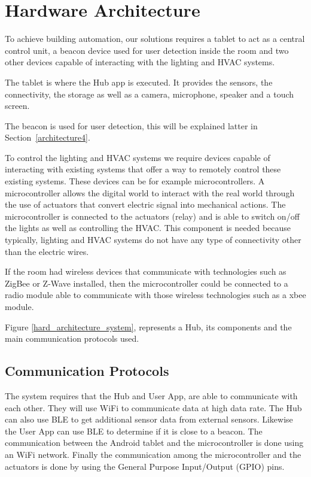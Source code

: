 \section{Hardware Architecture}\label{architecture3} 

To achieve building automation, our solutions requires a tablet to act as a central control unit, a beacon device used for user detection inside the room and two other devices capable of interacting with the lighting and \ac{HVAC} systems.

The tablet is where the Hub app is executed. It provides the sensors, the connectivity, the storage as well as a camera, microphone, speaker and a touch screen. 

The beacon is used for user detection, this will be explained latter in Section~\ref{architecture4}.

To control the lighting and \ac{HVAC} systems we require devices capable of interacting with existing systems that offer a way to remotely control these existing systems. These devices can be for example microcontrollers. A microcontroller allows the digital world to interact with the real world through the use of actuators that convert electric signal into mechanical actions. The microcontroller is connected to the actuators (relay) and is able to switch on/off the lights as well as controlling the HVAC. This component is needed because typically, lighting and HVAC systems do not have any type of connectivity other than the electric wires. 


If the room had wireless devices that communicate with technologies such as ZigBee or Z-Wave installed, then the microcontroller could be connected to a radio module able to communicate with those wireless technologies such as a xbee module.


Figure \ref{hard_architecture_system}, represents a Hub, its components and the main communication protocols used.

 

\subsection{Communication Protocols}

The system requires that the Hub and User App, are able to communicate with each other. They will use \ac{WiFi} to communicate data at high data rate. The Hub can also use \ac{BLE} to get additional sensor data from external sensors. Likewise the User App can use \ac{BLE} to determine if it is close to a beacon. The communication between the Android tablet and the microcontroller is done using an WiFi network. Finally the communication among the microcontroller and the actuators is done by using the General Purpose Input/Output (GPIO) pins.




